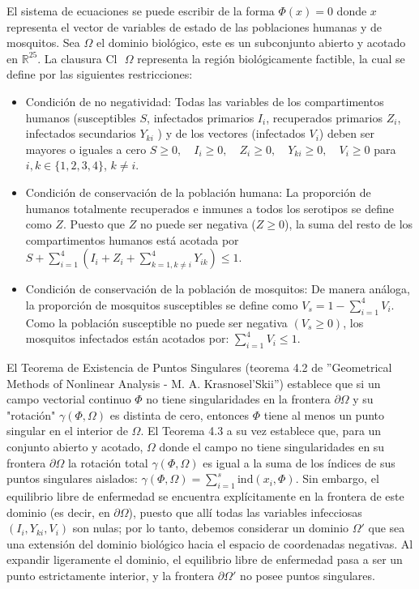 \documentclass{article}
\numberwithin{equation}{section}
\begin{document}
El sistema de ecuaciones se puede escribir de la forma $\Phi(x) = 0$ donde $x$ representa el vector de variables de estado de las poblaciones humanas y de mosquitos. Sea $\Omega$ el dominio biológico, este es un subconjunto abierto y acotado en $\mathbb{R}^{25}$. La clausura $\text{Cl}\text{ }\Omega$ representa la región biológicamente factible, la cual se define por las siguientes restricciones:
\begin{itemize}
    \item Condición de no negatividad: Todas las variables de los compartimentos humanos (susceptibles $S$, infectados primarios $I_i$, recuperados primarios $Z_i$, infectados secundarios $Y_{k i}$ ) y de los vectores (infectados $V_i$) deben ser mayores o iguales a cero $S \geq 0, \quad I_i \geq 0, \quad Z_i \geq 0, \quad Y_{k i} \geq 0, \quad V_i \geq 0$ para $i, k \in\{1,2,3,4\}$, $k \neq i$.

    \item Condición de conservación de la población humana: La proporción de humanos totalmente recuperados e inmunes a todos los serotipos se define como $Z$. Puesto que $Z$ no puede ser negativa ($Z \geq 0$), la suma del resto de los compartimentos humanos está acotada por $S+ \sum_{i=1}^4\left(I_i+Z_i+\sum_{k=1, k \neq i}^4 Y_{i k}\right) \leq 1$.
    
    \item Condición de conservación de la población de mosquitos: De manera análoga, la proporción de mosquitos susceptibles se define como $V_s=1-\sum_{i=1}^4 V_i$. Como la población susceptible no puede ser negativa $\left(V_s \geq 0\right)$, los mosquitos infectados están acotados por: $\sum_{i=1}^4 V_i \leq 1$.
\end{itemize}

El Teorema de Existencia de Puntos Singulares (teorema 4.2 de ''Geometrical Methods of Nonlinear Analysis - M. A. Krasnosel'Skii'') establece que si un campo vectorial continuo $\Phi$ no tiene singularidades en la frontera $\partial \Omega$ y su "rotación" $\gamma(\Phi, \Omega)$ es distinta de cero, entonces $\Phi$ tiene al menos un punto singular en el interior de $\Omega$. El Teorema 4.3 a su vez establece que, para un conjunto abierto y acotado, $\Omega$ donde el campo no tiene singularidades en su frontera $\partial \Omega$ la rotación total $\gamma(\Phi,\Omega)$ es igual a la suma de los índices de sus puntos singulares aislados: $\gamma(\Phi,\Omega) = \sum_{i=1}^s \text{ind}(x_i, \Phi)$. Sin embargo, el equilibrio libre de enfermedad se encuentra explícitamente en la frontera de este dominio (es decir, en $\partial \Omega$), puesto que allí todas las variables infecciosas $\left(I_i, Y_{k i}, V_i\right)$ son nulas; por lo tanto, debemos considerar un dominio $\Omega'$ que sea una extensión del dominio biológico hacia el espacio de coordenadas negativas. Al expandir ligeramente el dominio, el equilibrio libre de enfermedad pasa a ser un punto estrictamente interior, y la frontera $\partial \Omega'$ no posee puntos singulares. 
\end{document}
